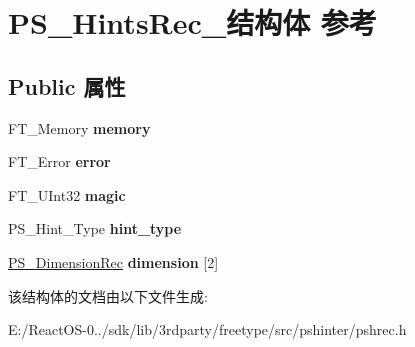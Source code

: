 \hypertarget{struct_p_s___hints_rec__}{}\section{P\+S\+\_\+\+Hints\+Rec\+\_\+结构体 参考}
\label{struct_p_s___hints_rec__}
\subsection*{Public 属性}
\begin{DoxyCompactItemize}
\item 
\mbox{\label{struct_p_s___hints_rec___a1955d8cbb903d8d54cc0acb659176534}} 
F\+T\+\_\+\+Memory {\bfseries memory}
\item 
\mbox{\label{struct_p_s___hints_rec___a61dfe6c6fcc2a970c75160109f357f13}} 
F\+T\+\_\+\+Error {\bfseries error}
\item 
\mbox{\label{struct_p_s___hints_rec___acb179af7515aeff1ff70b15785514d78}} 
F\+T\+\_\+\+U\+Int32 {\bfseries magic}
\item 
\mbox{\label{struct_p_s___hints_rec___ac67da6223bf159931da0edbd4885a46e}} 
P\+S\+\_\+\+Hint\+\_\+\+Type {\bfseries hint\+\_\+type}
\item 
\mbox{\label{struct_p_s___hints_rec___aee12973ffdaed3ae12c1438084e776ee}} 
\hyperlink{struct_p_s___dimension_rec__}{P\+S\+\_\+\+Dimension\+Rec} {\bfseries dimension} \mbox{[}2\mbox{]}
\end{DoxyCompactItemize}


该结构体的文档由以下文件生成\+:\begin{DoxyCompactItemize}
\item 
E\+:/\+React\+O\+S-\/0../sdk/lib/3rdparty/freetype/src/pshinter/pshrec.\+h\end{DoxyCompactItemize}
